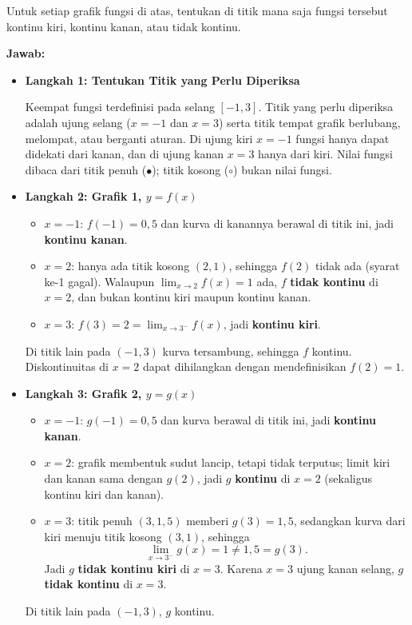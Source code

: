 \documentclass[10pt,a4paper]{article}
\begin{document}
\begin{enumerate}
Untuk setiap grafik fungsi di atas, tentukan di titik mana saja fungsi tersebut kontinu kiri, kontinu kanan, atau tidak kontinu.

\textbf{Jawab:}
\begin{itemize}
\item \textbf{Langkah 1: Tentukan Titik yang Perlu Diperiksa}

Keempat fungsi terdefinisi pada selang $[-1, 3]$. Titik yang perlu diperiksa adalah ujung selang ($x = -1$ dan $x = 3$) serta titik tempat grafik berlubang, melompat, atau berganti aturan.
Di ujung kiri $x = -1$ fungsi hanya dapat didekati dari kanan, dan di ujung kanan $x = 3$ hanya dari kiri.
Nilai fungsi dibaca dari titik penuh ($\bullet$); titik kosong ($\circ$) bukan nilai fungsi.

\item \textbf{Langkah 2: Grafik 1, $y = f(x)$}

\begin{itemize}
  \item $x = -1$: $f(-1) = 0{,}5$ dan kurva di kanannya berawal di titik ini, jadi \textbf{kontinu kanan}.
  \item $x = 2$: hanya ada titik kosong $(2,1)$, sehingga $f(2)$ tidak ada (syarat ke-1 gagal). Walaupun $\lim_{x \to 2} f(x) = 1$ ada, $f$ \textbf{tidak kontinu} di $x = 2$, dan bukan kontinu kiri maupun kontinu kanan.
  \item $x = 3$: $f(3) = 2 = \lim_{x \to 3^-} f(x)$, jadi \textbf{kontinu kiri}.
\end{itemize}
Di titik lain pada $(-1, 3)$ kurva tersambung, sehingga $f$ kontinu. Diskontinuitas di $x = 2$ dapat dihilangkan dengan mendefinisikan $f(2) = 1$.

\item \textbf{Langkah 3: Grafik 2, $y = g(x)$}

\begin{itemize}
  \item $x = -1$: $g(-1) = 0{,}5$ dan kurva berawal di titik ini, jadi \textbf{kontinu kanan}.
  \item $x = 2$: grafik membentuk sudut lancip, tetapi tidak terputus; limit kiri dan kanan sama dengan $g(2)$, jadi $g$ \textbf{kontinu} di $x = 2$ (sekaligus kontinu kiri dan kanan).
  \item $x = 3$: titik penuh $(3, 1{,}5)$ memberi $g(3) = 1{,}5$, sedangkan kurva dari kiri menuju titik kosong $(3,1)$, sehingga
  \[
  \lim_{x \to 3^-} g(x) = 1 \neq 1{,}5 = g(3).
  \]
  Jadi $g$ \textbf{tidak kontinu kiri} di $x = 3$. Karena $x = 3$ ujung kanan selang, $g$ \textbf{tidak kontinu} di $x = 3$.
\end{itemize}
Di titik lain pada $(-1, 3)$, $g$ kontinu.


\end{itemize}
\end{enumerate}
\end{document}

